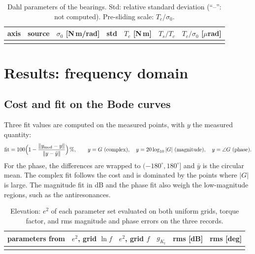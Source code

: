\documentclass[10pt,a4paper]{article}
\numberwithin{equation}{section}
\begin{document}
\begin{table}[H]\centering\footnotesize\setlength{\tabcolsep}{4pt}
\caption{Dahl parameters of the bearings. Std: relative standard deviation (``--'': not computed). Pre-sliding scale: $T_c/\sigma_0$.}\label{tab:friction}
\begin{tabular}{llrrrrr}\toprule
axis & source & $\sigma_0$ [N\,m/rad] & std & $T_c$ [N\,m] & $T_s/T_c$ & $T_c/\sigma_0$ [$\mu$rad] \\ \midrule
\\ \bottomrule
\end{tabular}\end{table}

\section{Results: frequency domain}\label{sec:res_freq}
\subsection{Cost and fit on the Bode curves}
Three fit values are computed on the measured points, with $y$ the measured quantity:
\begin{equation}
\mathrm{fit}=100\Bigl(1-\frac{\|y_\mathrm{mod}-y\|}{\|y-\bar y\|}\Bigr)\,\%,\qquad y=G\ \text{(complex)},\quad y=20\log_{10}|G|\ \text{(magnitude)},\quad y=\angle G\ \text{(phase)}.
\end{equation}
For the phase, the differences are wrapped to $(-180^\circ,180^\circ]$ and $\bar y$ is the circular mean. The complex fit follows the cost and is dominated by the points where $|G|$ is large. The magnitude fit in dB and the phase fit also weigh the low-magnitude regions, such as the antiresonances.

\begin{table}[H]\centering\footnotesize\setlength{\tabcolsep}{4pt}
\caption{Elevation: $e^2$ of each parameter set evaluated on both uniform grids, torque factor, and rms magnitude and phase errors on the three records.}\label{tab:cost_el}
\begin{tabular}{lrrrll}\toprule
parameters from & $e^2$, grid $\ln f$ & $e^2$, grid $f$ & $g_{K_t}$ & rms [dB] & rms [deg] \\ \midrule
\\ \bottomrule
\end{tabular}\end{table}
\end{document}
